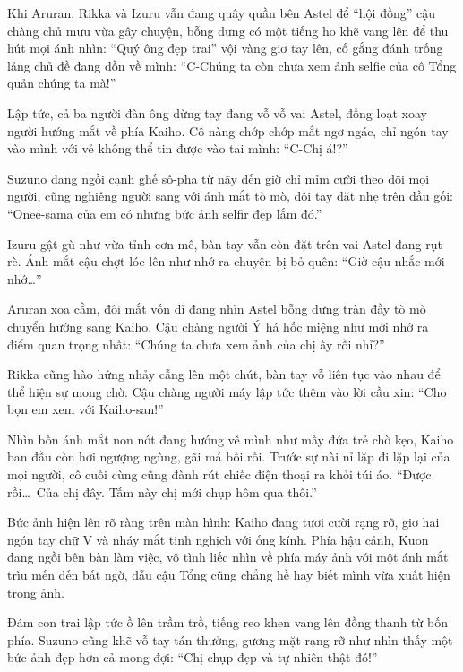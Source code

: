 \documentclass[../main.tex]{subfiles}
\begin{document}
\omk

Khi Aruran, Rikka và Izuru vẫn đang quây quần bên Astel để ``hội đồng'' cậu chàng chủ mưu vừa gây chuyện, bỗng dưng có một tiếng ho khẽ vang lên để thu hút mọi ánh nhìn: ``Quý ông đẹp trai'' vội vàng giơ tay lên, cố gắng đánh trống lảng chủ đề đang dồn về mình: ``C-Chúng ta còn chưa xem ảnh selfie của cô Tổng quản chúng ta mà!''

Lập tức, cả ba người đàn ông dừng tay đang vỗ vỗ vai Astel, đồng loạt xoay người hướng mắt về phía Kaiho. Cô nàng chớp chớp mắt ngơ ngác, chỉ ngón tay vào mình với vẻ không thể tin được vào tai mình: ``C-Chị á!?''

Suzuno đang ngồi cạnh ghế sô-pha từ nãy đến giờ chỉ mỉm cười theo dõi mọi người, cũng nghiêng người sang với ánh mắt tò mò, đôi tay đặt nhẹ trên đầu gối: ``Onee-sama của em có những bức ảnh selfir đẹp lắm đó.''

Izuru gật gù như vừa tỉnh cơn mê, bàn tay vẫn còn đặt trên vai Astel đang rụt rè. Ánh mắt cậu chợt lóe lên như nhớ ra chuyện bị bỏ quên: ``Giờ cậu nhắc mới nhớ\dots''

Aruran xoa cằm, đôi mắt vốn dĩ đang nhìn Astel bỗng dưng tràn đầy tò mò chuyển hướng sang Kaiho. Cậu chàng người Ý há hốc miệng như mới nhớ ra điểm quan trọng nhất: ``Chúng ta chưa xem ảnh của chị ấy rồi nhỉ?''

Rikka cũng hào hứng nhảy cẫng lên một chút, bàn tay vỗ liên tục vào nhau để thể hiện sự mong chờ. Cậu chàng người máy lập tức thêm vào lời cầu xin: ``Cho bọn em xem với Kaiho-san!''

Nhìn bốn ánh mắt non nớt đang hướng về mình như mấy đứa trẻ chờ kẹo, Kaiho ban đầu còn hơi ngượng ngùng, gãi má bối rối. Trước sự nài nỉ lặp đi lặp lại của mọi người, cô cuối cùng cũng đành rút chiếc điện thoại ra khỏi túi áo. ``Được rồi\dots\ Của chị đây. Tấm này chị mới chụp hôm qua thôi.''

Bức ảnh hiện lên rõ ràng trên màn hình: Kaiho đang tươi cười rạng rỡ, giơ hai ngón tay chữ V và nháy mắt tinh nghịch với ống kính. Phía hậu cảnh, Kuon đang ngồi bên bàn làm việc, vô tình liếc nhìn về phía máy ảnh với một ánh mắt trìu mến đến bất ngờ, dẫu cậu Tổng cũng chẳng hề hay biết mình vừa xuất hiện trong ảnh.

Đám con trai lập tức ồ lên trầm trồ, tiếng reo khen vang lên đồng thanh từ bốn phía. Suzuno cũng khẽ vỗ tay tán thưởng, gương mặt rạng rỡ như nhìn thấy một bức ảnh đẹp hơn cả mong đợi: ``Chị chụp đẹp và tự nhiên thật đó!''
\end{document}
